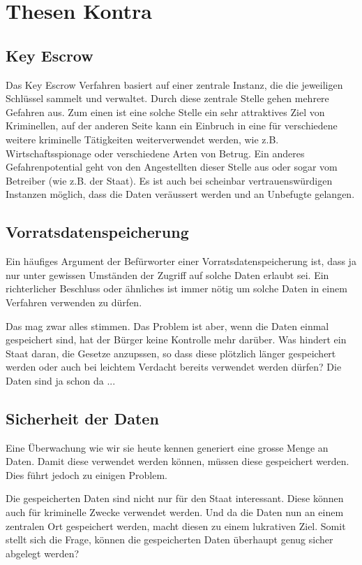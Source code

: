 \section*{Thesen Kontra}

\subsection*{Key Escrow}
Das Key Escrow Verfahren basiert auf einer zentrale Instanz,
die die jeweiligen Schlüssel sammelt und verwaltet.
Durch diese zentrale Stelle gehen mehrere Gefahren aus. Zum einen ist eine
solche Stelle ein sehr attraktives Ziel von Kriminellen, auf der
anderen Seite kann ein Einbruch in eine für verschiedene weitere
kriminelle Tätigkeiten weiterverwendet werden, wie z.B.
Wirtschaftsspionage oder verschiedene Arten von Betrug.
Ein anderes Gefahrenpotential geht von den Angestellten dieser Stelle aus oder
sogar vom Betreiber (wie z.B. der Staat).
Es ist auch bei scheinbar vertrauenswürdigen Instanzen möglich,
dass die Daten veräussert werden und an Unbefugte gelangen.

\subsection*{Vorratsdatenspeicherung}
Ein häufiges Argument der Befürworter einer Vorratsdatenspeicherung ist, dass ja nur unter gewissen Umständen der Zugriff auf solche Daten erlaubt sei. Ein richterlicher Beschluss oder ähnliches ist immer nötig um solche Daten in einem Verfahren verwenden zu dürfen.

Das mag zwar alles stimmen. Das Problem ist aber, wenn die Daten einmal gespeichert sind, hat der Bürger keine Kontrolle mehr darüber. Was hindert ein Staat daran, die Gesetze anzupssen, so dass diese plötzlich länger gespeichert werden oder auch bei leichtem Verdacht bereits verwendet werden dürfen? Die Daten sind ja schon da ...

\subsection*{Sicherheit der Daten}
Eine Überwachung wie wir sie heute kennen generiert eine grosse Menge an Daten. Damit diese verwendet werden können, müssen diese gespeichert werden. Dies führt jedoch zu einigen Problem.

Die gespeicherten Daten sind nicht nur für den Staat interessant. Diese können auch für kriminelle Zwecke verwendet werden. Und da die Daten nun an einem zentralen Ort gespeichert werden, macht diesen zu einem lukrativen Ziel. Somit stellt sich die Frage, können die gespeicherten Daten überhaupt genug sicher abgelegt werden?

